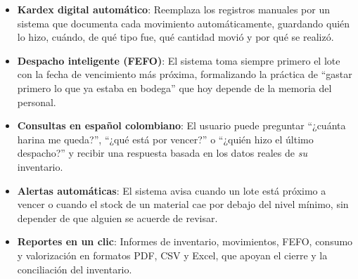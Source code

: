 \begin{itemize}
    \item \textbf{Kardex digital automático}: Reemplaza los registros manuales por un sistema que documenta cada movimiento automáticamente, guardando quién lo hizo, cuándo, de qué tipo fue, qué cantidad movió y por qué se realizó.
    \item \textbf{Despacho inteligente (FEFO)}: El sistema toma siempre primero el lote con la fecha de vencimiento más próxima, formalizando la práctica de ``gastar primero lo que ya estaba en bodega'' que hoy depende de la memoria del personal.
    \item \textbf{Consultas en español colombiano}: El usuario puede preguntar ``¿cuánta harina me queda?'', ``¿qué está por vencer?'' o ``¿quién hizo el último despacho?'' y recibir una respuesta basada en los datos reales de \textit{su} inventario.
    \item \textbf{Alertas automáticas}: El sistema avisa cuando un lote está próximo a vencer o cuando el stock de un material cae por debajo del nivel mínimo, sin depender de que alguien se acuerde de revisar.
    \item \textbf{Reportes en un clic}: Informes de inventario, movimientos, FEFO, consumo y valorización en formatos PDF, CSV y Excel, que apoyan el cierre y la conciliación del inventario.
\end{itemize}

\newpage

